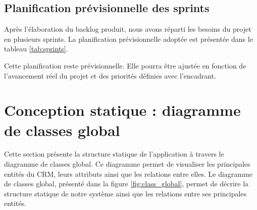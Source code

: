 \documentclass[12pt,a4paper,twoside,openany]{book}
\begin{document}
\subsection{Planification prévisionnelle des sprints}

Après l’élaboration du backlog produit, nous avons réparti les besoins du projet en plusieurs sprints. La planification prévisionnelle adoptée est présentée dans le tableau \ref{tab:sprints}.

\begin{table}[h]
\centering
\caption{Planification prévisionnelle des sprints}
\label{tab:sprints}
\small
{}
\end{table}

Cette planification reste prévisionnelle. Elle pourra être ajustée en fonction de l’avancement réel du projet et des priorités définies avec l’encadrant.

\section{Conception statique : diagramme de classes global}
Cette section présente la structure statique de l’application à travers le diagramme de classes global. Ce diagramme permet de visualiser les principales entités du CRM, leurs attributs ainsi que les relations entre elles.
Le diagramme de classes global, présenté dans la figure \ref{fig:class_global}, permet de décrire la structure statique de notre système ainsi que les relations entre ses principales entités.
\end{document}
